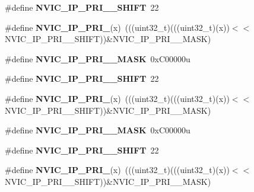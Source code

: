 \begin{DoxyCompactItemize}
\#define {\bfseries N\+V\+I\+C\+\_\+\+I\+P\+\_\+\+P\+R\+I\+\_\+\_\+\+S\+H\+I\+FT}~22
\item 
\mbox{\label{group___n_v_i_c___register___masks_gaaf8fe41995f4de6e7581515387b1bd91}} 
\#define {\bfseries N\+V\+I\+C\+\_\+\+I\+P\+\_\+\+P\+R\+I\+\_}(x)~(((uint32\+\_\+t)(((uint32\+\_\+t)(x))$<$$<$N\+V\+I\+C\+\_\+\+I\+P\+\_\+\+P\+R\+I\+\_\+\_\+\+S\+H\+I\+FT))\&N\+V\+I\+C\+\_\+\+I\+P\+\_\+\+P\+R\+I\+\_\+\_\+\+M\+A\+SK)
\item 
\mbox{\label{group___n_v_i_c___register___masks_gab53749f36c450457fd446a1711f69c13}} 
\#define {\bfseries N\+V\+I\+C\+\_\+\+I\+P\+\_\+\+P\+R\+I\+\_\+\_\+\+M\+A\+SK}~0x\+C00000u
\item 
\mbox{\label{group___n_v_i_c___register___masks_ga40e00b75ebe69a73a1ee9a41ef0c3d9b}} 
\#define {\bfseries N\+V\+I\+C\+\_\+\+I\+P\+\_\+\+P\+R\+I\+\_\+\_\+\+S\+H\+I\+FT}~22
\item 
\mbox{\label{group___n_v_i_c___register___masks_ga1847fa23291925bde4ad9f5372f2bbaa}} 
\#define {\bfseries N\+V\+I\+C\+\_\+\+I\+P\+\_\+\+P\+R\+I\+\_}(x)~(((uint32\+\_\+t)(((uint32\+\_\+t)(x))$<$$<$N\+V\+I\+C\+\_\+\+I\+P\+\_\+\+P\+R\+I\+\_\+\_\+\+S\+H\+I\+FT))\&N\+V\+I\+C\+\_\+\+I\+P\+\_\+\+P\+R\+I\+\_\+\_\+\+M\+A\+SK)
\item 
\mbox{\label{group___n_v_i_c___register___masks_ga99c3d327033fb0d1f9bdbef784ebe3ed}} 
\#define {\bfseries N\+V\+I\+C\+\_\+\+I\+P\+\_\+\+P\+R\+I\+\_\+\_\+\+M\+A\+SK}~0x\+C00000u
\item 
\mbox{\label{group___n_v_i_c___register___masks_gaa24809c00c9d32beee7171f4a75221e8}} 
\#define {\bfseries N\+V\+I\+C\+\_\+\+I\+P\+\_\+\+P\+R\+I\+\_\+\_\+\+S\+H\+I\+FT}~22
\item 
\mbox{\label{group___n_v_i_c___register___masks_ga2935915adf44a9c8c5abca1b4f7f294e}} 
\#define {\bfseries N\+V\+I\+C\+\_\+\+I\+P\+\_\+\+P\+R\+I\+\_}(x)~(((uint32\+\_\+t)(((uint32\+\_\+t)(x))$<$$<$N\+V\+I\+C\+\_\+\+I\+P\+\_\+\+P\+R\+I\+\_\+\_\+\+S\+H\+I\+FT))\&N\+V\+I\+C\+\_\+\+I\+P\+\_\+\+P\+R\+I\+\_\+\_\+\+M\+A\+SK)
$$
\end{DoxyCompactItemize}
